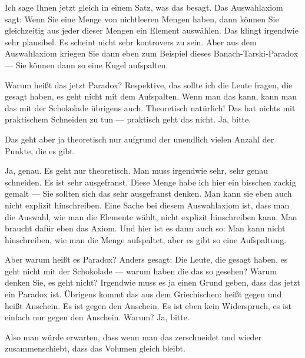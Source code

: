 \begin{spoken-clean}[00:04:46 - 00:06:20]
Ich sage Ihnen jetzt gleich in einem Satz, was das besagt. Das Auswahlaxiom sagt: Wenn Sie eine Menge von nichtleeren Mengen haben, dann können Sie gleichzeitig aus jeder dieser Mengen ein Element auswählen. Das klingt irgendwie sehr plausibel. Es scheint nicht sehr kontrovers zu sein. Aber aus dem Auswahlaxiom kriegen Sie dann eben zum Beispiel dieses Banach-Tarski-Paradox --- Sie können dann so eine Kugel aufspalten.

Warum heißt das jetzt Paradox? Respektive, das sollte ich die Leute fragen, die gesagt haben, es geht nicht mit dem Aufspalten. Wenn man das kann, kann man das mit der Schokolade übrigens auch. Theoretisch natürlich! Das hat nichts mit praktischem Schneiden zu tun --- praktisch geht das nicht. Ja, bitte.
\end{spoken-clean}

\begin{student-interaction}[Studentenantwort]
Das geht aber ja theoretisch nur aufgrund der unendlich vielen Anzahl der Punkte, die es gibt.
\end{student-interaction}

\begin{spoken-clean}[continued]
Ja, genau. Es geht nur theoretisch. Man muss irgendwie sehr, sehr genau schneiden. Es ist sehr ausgefranst. Diese Menge habe ich hier ein bisschen zackig gemalt --- Sie sollten sich das sehr ausgefranst denken. Man kann sie eben auch nicht explizit hinschreiben. Eine Sache bei diesem Auswahlaxiom ist, dass man die Auswahl, wie man die Elemente wählt, nicht explizit hinschreiben kann. Man braucht dafür eben das Axiom. Und hier ist es dann auch so: Man kann nicht hinschreiben, wie man die Menge aufspaltet, aber es gibt so eine Aufspaltung.

Aber warum heißt es Paradox? Anders gesagt: Die Leute, die gesagt haben, es geht nicht mit der Schokolade --- warum haben die das so gesehen? Warum denken Sie, es geht nicht? Irgendwie muss es ja einen Grund geben, dass das jetzt ein Paradox ist. Übrigens kommt das aus dem Griechischen:  heißt gegen und  heißt Anschein. Es ist gegen den Anschein. Es ist eben kein Widerspruch, es ist einfach nur gegen den Anschein. Warum? Ja, bitte.
\end{spoken-clean}

\begin{student-interaction}[Studentenantwort]
Also man würde erwarten, dass wenn man das zerschneidet und wieder zusammenschiebt, dass das Volumen gleich bleibt.
\end{student-interaction}

